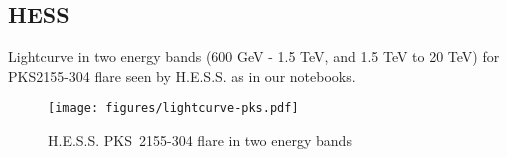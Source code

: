 \subsection{HESS}
\label{ssec:hess}

Lightcurve in two energy bands (600 GeV - 1.5 TeV, and 1.5 TeV to 20 TeV) for PKS2155-304 flare seen by H.E.S.S. as in our notebooks.

\begin{figure*}[t]
	\centering
	\texttt{[image: figures/lightcurve-pks.pdf]}
	\caption{
		H.E.S.S. PKS~2155-304 flare in two energy bands}
	\label{fig:fermi_ts_map}
\end{figure*}
